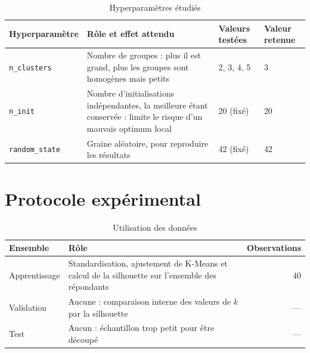 \documentclass[11pt,a4paper]{article}
\begin{document}
\begin{table}[htbp]
  \centering
  \caption{Hyperparamètres étudiés}
  \label{tab:hyper}
  \small
  \begin{tabular}{@{}l P{6.4cm} l l@{}}
    \toprule
    Hyperparamètre & Rôle et effet attendu & Valeurs testées & Valeur retenue \\
    \midrule
    \texttt{n\_clusters} & Nombre de groupes : plus il est grand, plus les groupes sont homogènes mais petits & 2, 3, 4, 5 & 3 \\
    \texttt{n\_init} & Nombre d'initialisations indépendantes, la meilleure étant conservée : limite le risque d'un mauvais optimum local & 20 (fixé) & 20 \\
    \texttt{random\_state} & Graine aléatoire, pour reproduire les résultats & 42 (fixé) & 42 \\
    \bottomrule
  \end{tabular}
\end{table}

\section{Protocole expérimental}
\label{sec:protocole}
\begin{table}[htbp]
  \centering
  \caption{Utilisation des données}
  \label{tab:decoupage}
  \small
  \begin{tabular}{@{}l P{9.5cm} r@{}}
    \toprule
    Ensemble & Rôle & Observations \\
    \midrule
    Apprentissage & Standardisation, ajustement de K-Means et calcul de la silhouette sur l'ensemble des répondants & 40 \\
    Validation & Aucune : comparaison interne des valeurs de $k$ par la silhouette & --- \\
    Test & Aucun : échantillon trop petit pour être découpé & --- \\
    \bottomrule
  \end{tabular}
\end{table}
\end{document}
